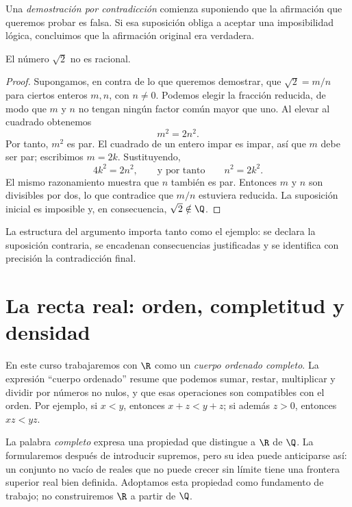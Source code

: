 Una \emph{demostración por contradicción} comienza suponiendo que la afirmación
que queremos probar es falsa. Si esa suposición obliga a aceptar una
imposibilidad lógica, concluimos que la afirmación original era verdadera.

\begin{teorema}
  El número \(\sqrt2\) no es racional.
\end{teorema}

\begin{proof}
Supongamos, en contra de lo que queremos demostrar, que
\(\sqrt2=m/n\) para ciertos enteros \(m,n\), con \(n\ne0\). Podemos elegir la
fracción reducida, de modo que \(m\) y \(n\) no tengan ningún factor común
mayor que uno. Al elevar al cuadrado obtenemos
\[
  m^2=2n^2.
\]
Por tanto, \(m^2\) es par. El cuadrado de un entero impar es impar, así que
\(m\) debe ser par; escribimos \(m=2k\). Sustituyendo,
\[
  4k^2=2n^2, \qquad\text{y por tanto}\qquad n^2=2k^2.
\]
El mismo razonamiento muestra que \(n\) también es par. Entonces \(m\) y \(n\)
son divisibles por dos, lo que contradice que \(m/n\) estuviera reducida. La
suposición inicial es imposible y, en consecuencia, \(\sqrt2\notin\Q\).
\end{proof}

La estructura del argumento importa tanto como el ejemplo: se declara la
suposición contraria, se encadenan consecuencias justificadas y se identifica
con precisión la contradicción final.

\section{La recta real: orden, completitud y densidad}
\label{sec:recta-real}

En este curso trabajaremos con \(\R\) como un \emph{cuerpo ordenado completo}.
La expresión ``cuerpo ordenado'' resume que podemos sumar, restar, multiplicar
y dividir por números no nulos, y que esas operaciones son compatibles con el
orden. Por ejemplo, si \(x<y\), entonces \(x+z<y+z\); si además \(z>0\),
entonces \(xz<yz\).

La palabra \emph{completo} expresa una propiedad que distingue a \(\R\) de
\(\Q\). La formularemos después de introducir supremos, pero su idea puede
anticiparse así: un conjunto no vacío de reales que no puede crecer sin límite
tiene una frontera superior real bien definida. Adoptamos esta propiedad como
fundamento de trabajo; no construiremos \(\R\) a partir de \(\Q\).

